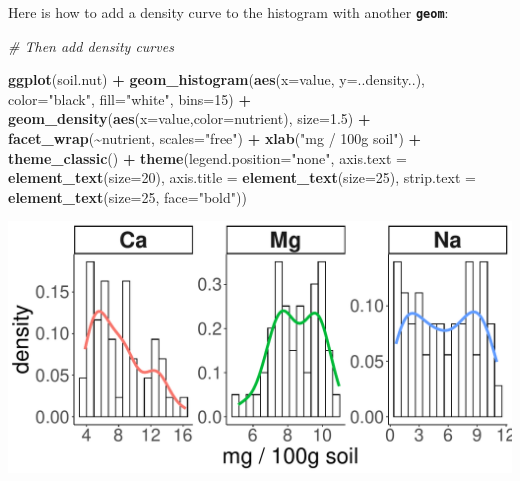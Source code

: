 \documentclass[
]{article}
\newenvironment{Shaded}{\begin{snugshade}}{\end{snugshade}}
\newcommand{\AttributeTok}[1]{\textcolor[rgb]{0.13,0.29,0.53}{#1}}
\newcommand{\CommentTok}[1]{\textcolor[rgb]{0.56,0.35,0.01}{\textit{#1}}}
\newcommand{\DecValTok}[1]{\textcolor[rgb]{0.00,0.00,0.81}{#1}}
\newcommand{\FloatTok}[1]{\textcolor[rgb]{0.00,0.00,0.81}{#1}}
\newcommand{\FunctionTok}[1]{\textcolor[rgb]{0.13,0.29,0.53}{\textbf{#1}}}
\newcommand{\NormalTok}[1]{#1}
\newcommand{\SpecialCharTok}[1]{\textcolor[rgb]{0.81,0.36,0.00}{\textbf{#1}}}
\newcommand{\StringTok}[1]{\textcolor[rgb]{0.31,0.60,0.02}{#1}}
\begin{document}
Here is how to add a density curve to the histogram with another
\textbf{\texttt{geom}}:

\begin{Shaded}
\begin{Highlighting}[]
\CommentTok{\# Then add density curves}

\FunctionTok{ggplot}\NormalTok{(soil.nut) }\SpecialCharTok{+}
  \FunctionTok{geom\_histogram}\NormalTok{(}\FunctionTok{aes}\NormalTok{(}\AttributeTok{x=}\NormalTok{value, }\AttributeTok{y=}\NormalTok{..density..), }\AttributeTok{color=}\StringTok{"black"}\NormalTok{, }\AttributeTok{fill=}\StringTok{"white"}\NormalTok{, }\AttributeTok{bins=}\DecValTok{15}\NormalTok{) }\SpecialCharTok{+}
  \FunctionTok{geom\_density}\NormalTok{(}\FunctionTok{aes}\NormalTok{(}\AttributeTok{x=}\NormalTok{value,}\AttributeTok{color=}\NormalTok{nutrient), }\AttributeTok{size=}\FloatTok{1.5}\NormalTok{) }\SpecialCharTok{+}
  \FunctionTok{facet\_wrap}\NormalTok{(}\SpecialCharTok{\textasciitilde{}}\NormalTok{nutrient, }\AttributeTok{scales=}\StringTok{"free"}\NormalTok{) }\SpecialCharTok{+}
  \FunctionTok{xlab}\NormalTok{(}\StringTok{"mg / 100g soil"}\NormalTok{) }\SpecialCharTok{+}
  \FunctionTok{theme\_classic}\NormalTok{() }\SpecialCharTok{+}
  \FunctionTok{theme}\NormalTok{(}\AttributeTok{legend.position=}\StringTok{"none"}\NormalTok{,}
        \AttributeTok{axis.text =} \FunctionTok{element\_text}\NormalTok{(}\AttributeTok{size=}\DecValTok{20}\NormalTok{),}
        \AttributeTok{axis.title =} \FunctionTok{element\_text}\NormalTok{(}\AttributeTok{size=}\DecValTok{25}\NormalTok{),}
        \AttributeTok{strip.text =} \FunctionTok{element\_text}\NormalTok{(}\AttributeTok{size=}\DecValTok{25}\NormalTok{, }\AttributeTok{face=}\StringTok{"bold"}\NormalTok{))}
\end{Highlighting}
\end{Shaded}

\includegraphics{module1_3_files/figure-latex/unnamed-chunk-38-1.pdf}
\end{document}
